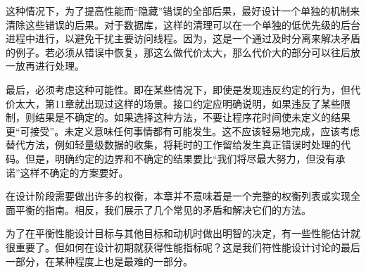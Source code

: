 这种情况下，为了提高性能而“隐藏”错误的全部后果，最好设计一个单独的机制来清除这些错误的后果。对于数据库，这样的清理可以在一个单独的低优先级的后台进程中进行，以避免干扰主要访问线程。因为，这是一个通过及时分离来解决矛盾的例子。若必须从错误中恢复，那这么做代价太大，那么代价大的部分可以往后放一放再进行处理。

最后，必须考虑这种可能性。即在某些情况下，即使是发现违反约定的行为，但代价太大，第11章就出现过这样的场景。接口约定应明确说明，如果违反了某些限制，则结果是不确定的。如果选择这种方法，不要让程序花时间使未定义的结果更“可接受”。未定义意味任何事情都有可能发生。这不应该轻易地完成，应该考虑替代方法，例如轻量级数据的收集，将耗时的工作留给发生真正错误时处理的代码。但是，明确约定的边界和不确定的结果要比“我们将尽最大努力，但没有承诺”这样不确定的方案要好。 

在设计阶段需要做出许多的权衡，本章并不意味着是一个完整的权衡列表或实现全面平衡的指南。相反，我们展示了几个常见的矛盾和解决它们的方法。 

为了在平衡性能设计目标与其他目标和动机时做出明智的决定，有一些性能估计就很重要了。但如何在设计初期就获得性能指标呢？这是我们符性能设计讨论的最后一部分，在某种程度上也是最难的一部分。














